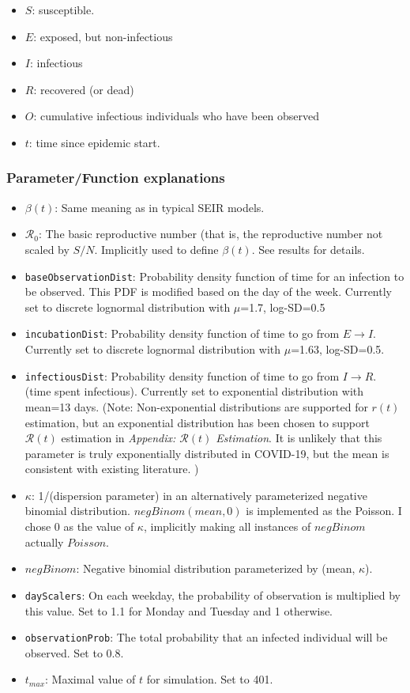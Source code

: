 \documentclass{article}
\newcommand{\nR}{\mathcal{R}}
\newcommand{\code}[1]{\texttt{#1}}
\begin{document}
\begin{itemize}
    \item $S$: susceptible.
    \item $E$: exposed, but non-infectious
    \item $I$: infectious
    \item $R$: recovered (or dead)
    \item $O$: cumulative infectious individuals who have been observed 
    \item $t$: time since epidemic start.
\end{itemize}

\subsubsection{Parameter/Function explanations}
\begin{itemize}
    \item $\beta(t)$: Same meaning as in typical SEIR models. 
    \item $\nR_0$: The basic reproductive number (that is, the reproductive number not scaled by $S/N$. Implicitly used to define $\beta(t)$. See results for details.
    \item \code{baseObservationDist}: Probability density function of time for an infection to be observed. This PDF is modified based on the day of the week. Currently set to discrete lognormal distribution with $\mu$=1.7, log-SD=0.5 
    \item \code{incubationDist}: Probability density function of time to go from $E \rightarrow I$. Currently set to discrete lognormal distribution with $\mu$=1.63, log-SD=0.5. \cite{McAloon}
    \item \code{infectiousDist}: Probability density function of time to go from $I \rightarrow R$. (time spent infectious). Currently set to exponential distribution with mean=13 days. (Note: Non-exponential distributions are supported for $r(t)$ estimation, but an exponential distribution has been chosen to support $\nR(t)$ estimation in \emph{Appendix: $\nR(t)$ Estimation}. It is unlikely that this parameter is truly exponentially distributed in COVID-19, but the mean is consistent with existing literature. \cite{infectiousperiod})
    \item $\kappa$: 1/(dispersion parameter) in an alternatively parameterized negative binomial distribution. \cite{NegBinom} $negBinom(mean, 0)$ is implemented as the Poisson. I chose 0 as the value of $\kappa$, implicitly making all instances of $negBinom$ actually $Poisson$.
    \item $negBinom$: Negative binomial distribution parameterized by (mean, $\kappa$). 
    \item \code{dayScalers}: On each weekday, the probability of observation is multiplied by this value. Set to 1.1 for Monday and Tuesday and 1 otherwise. 
    \item \code{observationProb}: The total probability that an infected individual will be observed. Set to 0.8.
    \item $t_{max}$: Maximal value of $t$ for simulation. Set to 401.
\end{itemize}
\end{document}
